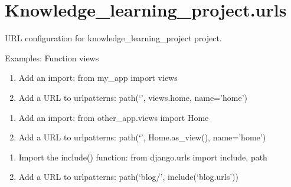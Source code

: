 \documentclass[letterpaper,10pt,english]{sphinxmanual}
\begin{document}
\section{Knowledge\_learning\_project.urls}
\label{\detokenize{knowledge_learning_project:module-knowledge_learning_project.urls}}\label{\detokenize{knowledge_learning_project:knowledge-learning-project-urls}}
\sphinxAtStartPar
URL configuration for knowledge\_learning\_project project.
\begin{description}
\sphinxAtStartPar
{}

\end{description}

\sphinxAtStartPar
Examples:
Function views
\begin{enumerate}
%
\item {} 
\sphinxAtStartPar
Add an import:  from my\_app import views

\item {} 
\sphinxAtStartPar
Add a URL to urlpatterns:  path(‘’, views.home, name=’home’)

\end{enumerate}
\begin{description}
\begin{enumerate}
%
\item {} 
\sphinxAtStartPar
Add an import:  from other\_app.views import Home

\item {} 
\sphinxAtStartPar
Add a URL to urlpatterns:  path(‘’, Home.as\_view(), name=’home’)

\end{enumerate}

\begin{enumerate}
%
\item {} 
\sphinxAtStartPar
Import the include() function: from django.urls import include, path

\item {} 
\sphinxAtStartPar
Add a URL to urlpatterns:  path(‘blog/’, include(‘blog.urls’))

\end{enumerate}

\end{description}
\end{document}

